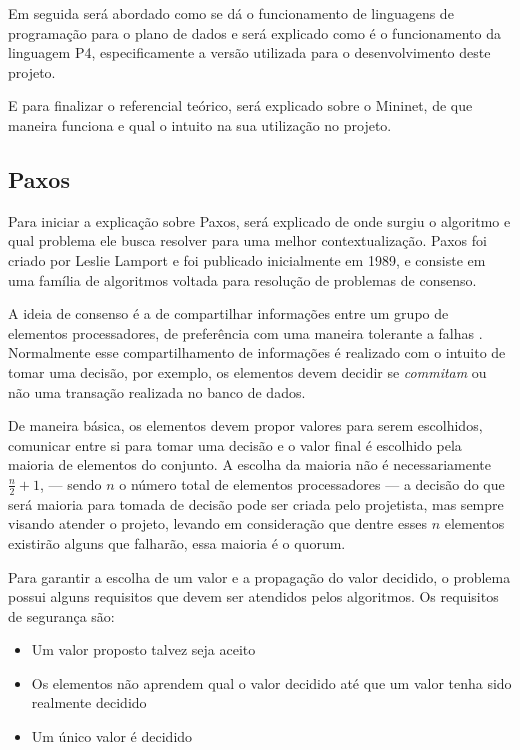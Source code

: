 \documentclass[12pt,
openright, 
oneside,
a4paper,
brazil]{facom-ufu-abntex2}
\theoremstyle{definition}
\begin{document}
Em seguida será abordado como se dá o funcionamento de linguagens de programação 
para o plano de dados e será explicado como é o funcionamento da linguagem P4, 
especificamente a versão utilizada para o desenvolvimento deste projeto.

E para finalizar o referencial teórico, será explicado sobre o Mininet, de que
maneira funciona e qual o intuito na sua utilização no projeto.

\subsection{Paxos}
Para iniciar a explicação sobre Paxos, será explicado de onde surgiu o algoritmo e qual
problema ele busca resolver para uma melhor contextualização. Paxos foi criado por 
Leslie Lamport e foi publicado inicialmente em 1989, e consiste em uma família de algoritmos
voltada para resolução de problemas de consenso. 

A ideia de consenso é a de compartilhar informações entre um grupo de elementos
processadores, de preferência com uma maneira tolerante a falhas \citep{barborak1993consensus}.
Normalmente esse compartilhamento de informações é realizado com o intuito de tomar
uma decisão, por exemplo, os elementos devem decidir se \textit{commitam} ou não
uma transação realizada no banco de dados. 

De maneira básica, os elementos devem propor valores para serem escolhidos, 
comunicar entre si para tomar uma decisão e o valor final é escolhido pela maioria de 
elementos do conjunto.
A escolha da maioria não é necessariamente $\frac{n}{2}+1$, --- sendo $n$ o número
total de elementos processadores --- a decisão do que será maioria para tomada de decisão
pode ser criada pelo projetista, mas sempre visando atender o projeto, levando
em consideração que dentre esses $n$ elementos existirão alguns que falharão, essa maioria
é o quorum.

Para garantir a escolha de um valor e a propagação do valor decidido, o problema
possui alguns requisitos que devem ser atendidos pelos algoritmos. Os requisitos de
segurança são:

\begin{itemize}
    \item Um valor proposto talvez seja aceito
    \item Os elementos não aprendem qual o valor decidido até que um valor 
    tenha sido realmente decidido
    \item Um único valor é decidido
\end{itemize}
\end{document}
